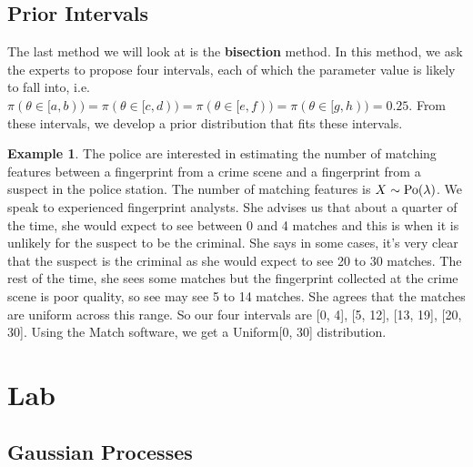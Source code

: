 \documentclass[
]{book}
\theoremstyle{definition}
\theoremstyle{definition}
\newtheorem{example}{Example}[chapter]
\theoremstyle{definition}
\theoremstyle{definition}
\theoremstyle{remark}
\begin{document}
\hypertarget{prior-intervals}{%
\subsection{Prior Intervals}\label{prior-intervals}}

The last method we will look at is the \textbf{bisection} method. In this method, we ask the experts to propose four intervals, each of which the parameter value is likely to fall into, i.e.~\(\pi(\theta \in [a, b)) = \pi(\theta \in [c, d)) = \pi(\theta \in [e, f))= \pi(\theta \in [g, h)) = 0.25\). From these intervals, we develop a prior distribution that fits these intervals.

\begin{example}
The police are interested in estimating the number of matching features between a fingerprint from a crime scene and a fingerprint from a suspect in the police station. The number of matching features is \(X \sim \hbox{Po}(\lambda)\). We speak to experienced fingerprint analysts. She advises us that about a quarter of the time, she would expect to see between 0 and 4 matches and this is when it is unlikely for the suspect to be the criminal. She says in some cases, it's very clear that the suspect is the criminal as she would expect to see 20 to 30 matches. The rest of the time, she sees some matches but the fingerprint collected at the crime scene is poor quality, so see may see 5 to 14 matches. She agrees that the matches are uniform across this range. So our four intervals are {[}0, 4{]}, {[}5, 12{]}, {[}13, 19{]}, {[}20, 30{]}. Using the Match software, we get a Uniform{[}0, 30{]} distribution.
\end{example}

\hypertarget{lab-3}{%
\section{Lab}\label{lab-3}}

\hypertarget{gaussian-processes-1}{%
\subsection{Gaussian Processes}\label{gaussian-processes-1}}
\end{document}
